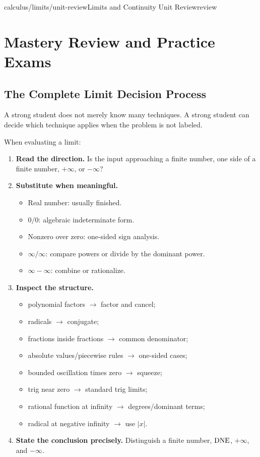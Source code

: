 \begin{webpage}{calculus/limits/unit-review}{Limits and Continuity Unit Review}{review}
\chapter{Mastery Review and Practice Exams}

\section{The Complete Limit Decision Process}

A strong student does not merely know many techniques. A strong student can decide which technique applies when the problem is not labeled.

\begin{bgmethod}[title={Master Decision Tree}]
When evaluating a limit:
\begin{enumerate}
  \item \textbf{Read the direction.} Is the input approaching a finite number, one side of a finite number, \(+\infty\), or \(-\infty\)?
  \item \textbf{Substitute when meaningful.}
  \begin{itemize}
    \item Real number: usually finished.
    \item \(0/0\): algebraic indeterminate form.
    \item Nonzero over zero: one-sided sign analysis.
    \item \(\infty/\infty\): compare powers or divide by the dominant power.
    \item \(\infty-\infty\): combine or rationalize.
  \end{itemize}
  \item \textbf{Inspect the structure.}
  \begin{itemize}
    \item polynomial factors \(\to\) factor and cancel;
    \item radicals \(\to\) conjugate;
    \item fractions inside fractions \(\to\) common denominator;
    \item absolute values/piecewise rules \(\to\) one-sided cases;
    \item bounded oscillation times zero \(\to\) squeeze;
    \item trig near zero \(\to\) standard trig limits;
    \item rational function at infinity \(\to\) degrees/dominant terms;
    \item radical at negative infinity \(\to\) use \(|x|\).
  \end{itemize}
  \item \textbf{State the conclusion precisely.} Distinguish a finite number, \(\mathrm{DNE}\), \(+\infty\), and \(-\infty\).
\end{enumerate}
\end{bgmethod}
\end{webpage}

